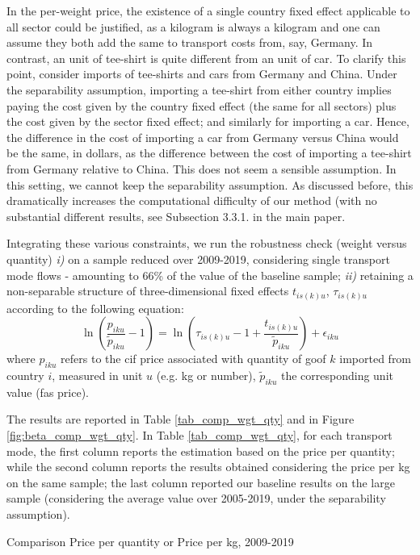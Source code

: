 \documentclass[11pt,twoside, authoryear]{elsarticle}
\begin{document}
In the per-weight price, the existence of a single country fixed effect applicable to all sector could be justified, as a kilogram is always a kilogram and one can assume they both add the same to transport costs from, say, Germany. In contrast, an unit of tee-shirt is quite different from an unit of car. To clarify this point, consider imports of tee-shirts and cars from Germany and China.
Under the separability assumption, importing a tee-shirt from either country implies paying the cost given by the  country fixed effect (the same for all sectors) plus the cost given by the sector fixed effect; and similarly for importing a car.
Hence, the difference in the cost of importing a car from Germany versus China would be the same, in dollars, as the difference between the cost of importing a tee-shirt from Germany relative to China. This does not seem a sensible assumption.
In this setting, we cannot keep the separability assumption.
As discussed before, this dramatically increases the computational difficulty of our method (with no substantial different results, see Subsection 3.3.1. in the main paper.\smallskip

Integrating these various constraints, we run the robustness check (weight versus quantity) \textit{i)} on a sample reduced over 2009-2019, considering single transport mode flows - amounting to 66\% of the value of the baseline sample; \textit{ii)} retaining a non-separable structure of three-dimensional fixed effects $t_{is(k)u}$, $\tau_{is(k)u}$ according to the following equation:
$$
\ln\left(\frac{p_{iku}}{\widetilde{p}_{iku}}-1 \right)= \ln \left(\tau_{is(k)u} -1+\frac{t_{is(k)u} }{\widetilde{p}_{iku}} \right) + \epsilon_{iku}
$$
\noindent where $p_{iku}$ refers to the cif price associated with quantity of goof $k$ imported from country $i$, measured in unit $u$ (e.g. kg or number), $\widetilde{p}_{iku}$ the corresponding unit value (fas price).


The results are reported in Table \ref{tab_comp_wgt_qty} and in Figure \ref{fig:beta_comp_wgt_qty}. In Table \ref{tab_comp_wgt_qty}, for each transport mode, the first column reports the estimation based on the price per quantity; while the second column reports the results obtained considering the price per kg on the same sample; the last column reported our baseline results on the large sample (considering the average value over 2005-2019, under the separability assumption).


\begin{table}[htbp]
	\caption{Comparison Price per quantity or Price per kg, 2009-2019}
	\begin{center}		
		
	\end{center}
	\label{tab_comp_wgt_qty}%
\end{table}%
\end{document}
